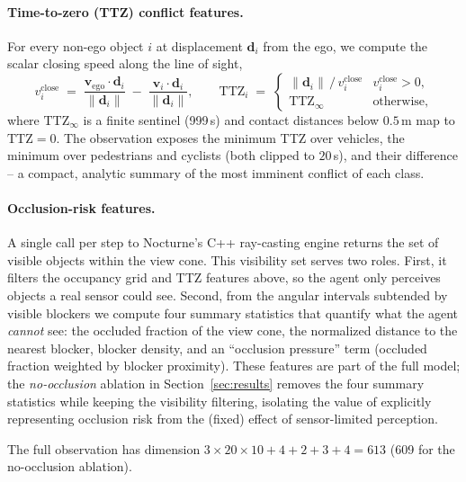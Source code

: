 \documentclass{article}
\begin{document}
\paragraph{Time-to-zero (TTZ) conflict features.}
For every non-ego object $i$ at displacement $\mathbf{d}_i$ from the ego, we
compute the scalar closing speed along the line of sight,
\begin{equation}
  v^{\text{close}}_i \;=\;
  \frac{\mathbf{v}_{\text{ego}} \cdot \mathbf{d}_i}{\lVert \mathbf{d}_i \rVert}
  \;-\;
  \frac{\mathbf{v}_i \cdot \mathbf{d}_i}{\lVert \mathbf{d}_i \rVert},
  \qquad
  \text{TTZ}_i \;=\;
  \begin{cases}
    \lVert \mathbf{d}_i \rVert \,/\, v^{\text{close}}_i & v^{\text{close}}_i > 0,\\[2pt]
    \text{TTZ}_{\infty} & \text{otherwise},
  \end{cases}
\end{equation}
where $\text{TTZ}_{\infty}$ is a finite sentinel (999\,s) and contact
distances below $0.5$\,m map to $\text{TTZ} = 0$. The observation exposes
the minimum TTZ over vehicles, the minimum over pedestrians and cyclists
(both clipped to $20$\,s), and their difference -- a compact, analytic
summary of the most imminent conflict of each class.

\paragraph{Occlusion-risk features.}
A single call per step to Nocturne's C++ ray-casting engine returns the set
of visible objects within the view cone. This visibility set serves two
roles. First, it filters the occupancy grid and TTZ features above, so the
agent only perceives objects a real sensor could see. Second, from the
angular intervals subtended by visible blockers we compute four summary
statistics that quantify what the agent \emph{cannot} see: the occluded
fraction of the view cone, the normalized distance to the nearest blocker,
blocker density, and an ``occlusion pressure'' term (occluded fraction
weighted by blocker proximity). These features are part of the full model;
the \emph{no-occlusion} ablation in Section~\ref{sec:results} removes the
four summary statistics while keeping the visibility filtering, isolating
the value of explicitly representing occlusion risk from the (fixed) effect
of sensor-limited perception.

The full observation has dimension
$3 \times 20 \times 10 + 4 + 2 + 3 + 4 = 613$ (609 for the no-occlusion
ablation).
\end{document}
